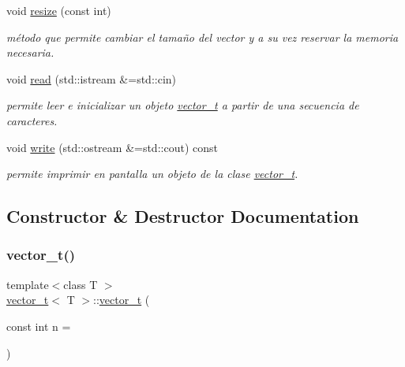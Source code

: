 \begin{DoxyCompactItemize}
void \hyperlink{classvector__t_a239516986f1c608d1836bd31c2bd5e30}{resize} (const int)
\begin{DoxyCompactList}\small\item\em método que permite cambiar el tamaño del vector y a su vez reservar la memoria necesaria. \end{DoxyCompactList}\item 
\mbox{\label{classvector__t_a3b0f6ecf91062e346f849cc88f9ab709}} 
void \hyperlink{classvector__t_a3b0f6ecf91062e346f849cc88f9ab709}{read} (std\+::istream \&=std\+::cin)
\begin{DoxyCompactList}\small\item\em permite leer e inicializar un objeto \hyperlink{classvector__t}{vector\+\_\+t} a partir de una secuencia de caracteres. \end{DoxyCompactList}\item 
\mbox{\label{classvector__t_a62f6c0cd2798964c3ca5c0267136feb9}} 
void \hyperlink{classvector__t_a62f6c0cd2798964c3ca5c0267136feb9}{write} (std\+::ostream \&=std\+::cout) const
\begin{DoxyCompactList}\small\item\em permite imprimir en pantalla un objeto de la clase \hyperlink{classvector__t}{vector\+\_\+t}. \end{DoxyCompactList}\end{DoxyCompactItemize}


\subsection{Constructor \& Destructor Documentation}
\mbox{\label{classvector__t_a1b574675f370c6e8ca1ffa1e6c760e82}} 
\subsubsection{\texorpdfstring{vector\+\_\+t()}{vector\_t()}\hspace{0.1cm}{\footnotesize\ttfamily [1/2]}}
{\footnotesize\ttfamily template$<$class T $>$ \\
\hyperlink{classvector__t}{vector\+\_\+t}$<$ T $>$\+::\hyperlink{classvector__t}{vector\+\_\+t} (\begin{DoxyParamCaption}\item[{const int}]{n = {} }\end{DoxyParamCaption})}



